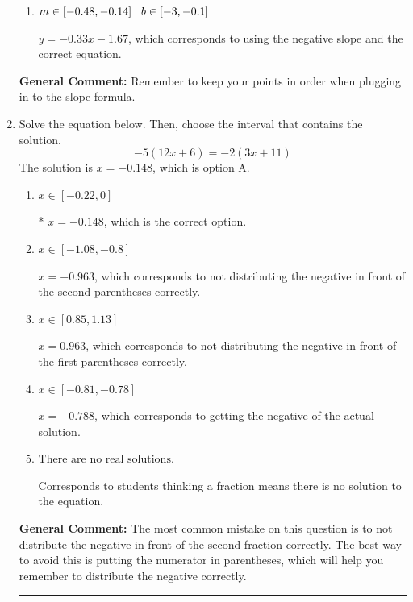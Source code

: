 \documentclass{extbook}[14pt]
\newcommand{\litem}[1]{\item #1

\rule{\textwidth}{0.4pt}}
\begin{document}
\begin{enumerate}
{\begin{enumerate}[label=\Alph*.]
 $y = 0.33x -15$, which corresponds to using the correct slope/equation but not distributing correctly using the second point.
\item \( m \in [-0.48, -0.14] \hspace*{3mm} b \in [-3, -0.1] \)

 $y = -0.33x -1.67$, which corresponds to using the negative slope and the correct equation.
\end{enumerate}

\textbf{General Comment:} Remember to keep your points in order when plugging in to the slope formula.
}
\litem{
Solve the equation below. Then, choose the interval that contains the solution.
\[ -5(12x + 6) = -2(3x + 11) \]The solution is \( x = -0.148 \), which is option A.\begin{enumerate}[label=\Alph*.]
\item \( x \in [-0.22, 0] \)

* $x = -0.148$, which is the correct option.
\item \( x \in [-1.08, -0.8] \)

$x = -0.963$, which corresponds to not distributing the negative in front of the second parentheses correctly.
\item \( x \in [0.85, 1.13] \)

$x = 0.963$, which corresponds to not distributing the negative in front of the first parentheses correctly.
\item \( x \in [-0.81, -0.78] \)

$x = -0.788$, which corresponds to getting the negative of the actual solution.
\item \( \text{There are no real solutions.} \)

Corresponds to students thinking a fraction means there is no solution to the equation.
\end{enumerate}

\textbf{General Comment:} The most common mistake on this question is to not distribute the negative in front of the second fraction correctly. The best way to avoid this is putting the numerator in parentheses, which will help you remember to distribute the negative correctly.
}
\end{enumerate}
\end{document}
